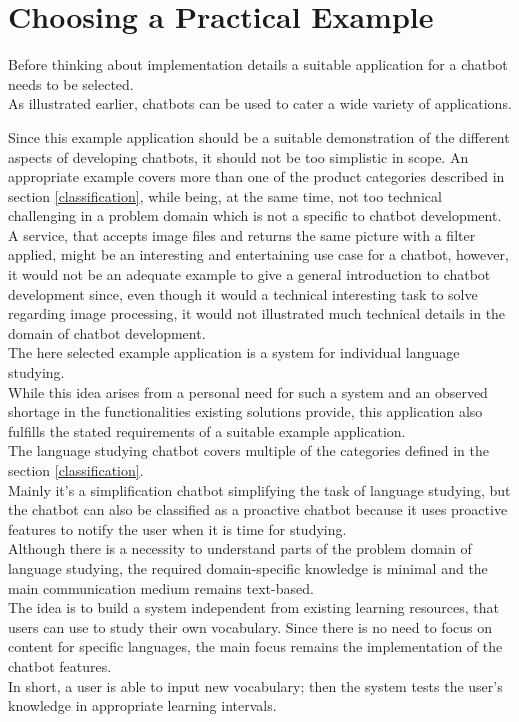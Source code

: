 \section{Choosing a Practical Example}

Before thinking about implementation details a suitable application for a chatbot needs to be selected.
\\
As illustrated earlier, chatbots can be used to cater a wide variety of applications.

Since this example application should be a suitable demonstration of the different aspects of developing chatbots,
it should not be too simplistic in scope.
An appropriate example covers more than one of the product categories described in section \ref{classification},
while being, at the same time, not too technical challenging in a problem domain which is not a specific to chatbot development.
\\
A service, that accepts image files and returns the same picture with a filter applied, might be an interesting and entertaining use case for a chatbot, however, it would not be an adequate example to give a general introduction to chatbot development since, even though it would a technical interesting task to solve regarding image processing, it would not illustrated much technical details in the domain of chatbot development.
\\

The here selected example application is a system for individual language studying.
\\
While this idea arises from a personal need for such a system and an observed shortage in the functionalities existing solutions provide,
this application also fulfills the stated requirements of a suitable example application.
\\

The language studying chatbot covers multiple of the categories defined in the section \ref{classification}.
\\
Mainly it's a simplification chatbot simplifying the task of language studying,
but the chatbot can also be classified as a proactive chatbot because it uses proactive features to notify the user when it is time for studying.
\\

Although there is a necessity to understand parts of the problem domain of language studying,
the required domain-specific knowledge is minimal and the main communication medium remains text-based.
\\

The idea is to build a system independent from existing learning resources, that users can use to study their own vocabulary.
Since there is no need to focus on content for specific languages, the main focus remains the implementation of the chatbot features.
\\
In short, a user is able to input new vocabulary; then the system tests the user's knowledge in appropriate learning intervals.
